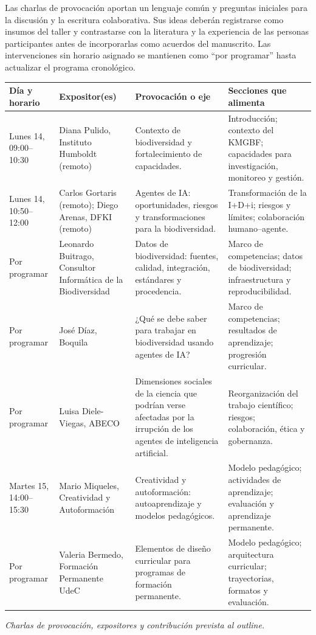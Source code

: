 \documentclass[11pt,a4paper]{article}
\begin{document}
Las charlas de provocación aportan un lenguaje común y preguntas iniciales para
la discusión y la escritura colaborativa. Sus ideas deberán registrarse como
insumos del taller y contrastarse con la literatura y la experiencia de las
personas participantes antes de incorporarlas como acuerdos del manuscrito. Las
intervenciones sin horario asignado se mantienen como ``por programar'' hasta
actualizar el programa cronológico.

\begin{center}
\footnotesize
\begin{tabularx}{\textwidth}{@{}
  >{\raggedright\arraybackslash}p{2.2cm}
  >{\raggedright\arraybackslash}p{3.4cm}
  >{\raggedright\arraybackslash}X
  >{\raggedright\arraybackslash}p{3.5cm}@{}}
\toprule
\textbf{Día y horario} & \textbf{Expositor(es)} &
\textbf{Provocación o eje} & \textbf{Secciones que alimenta}\\
\midrule
Lunes 14, 09:00--10:30 &
Diana Pulido, Instituto Humboldt (remoto) &
Contexto de biodiversidad y fortalecimiento de capacidades. &
Introducción; contexto del KMGBF; capacidades para investigación, monitoreo y
gestión.\\
Lunes 14, 10:50--12:00 &
Carlos Gortaris (remoto); Diego Arenas, DFKI (remoto) &
Agentes de IA: oportunidades, riesgos y transformaciones para la biodiversidad. &
Transformación de la I+D+i; riesgos y límites; colaboración humano--agente.\\
Por programar &
Leonardo Buitrago, Consultor Informática de la Biodiversidad &
Datos de biodiversidad: fuentes, calidad, integración, estándares y
procedencia. &
Marco de competencias; datos de biodiversidad; infraestructura y
reproducibilidad.\\
Por programar &
José Díaz, Boquila &
¿Qué se debe saber para trabajar en biodiversidad usando agentes de IA? &
Marco de competencias; resultados de aprendizaje; progresión curricular.\\
Por programar &
Luisa Diele-Viegas, ABECO &
Dimensiones sociales de la ciencia que podrían verse afectadas por la irrupción
de los agentes de inteligencia artificial. &
Reorganización del trabajo científico; riesgos; colaboración, ética y
gobernanza.\\
Martes 15, 14:00--15:30 &
Mario Miqueles, Creatividad y Autoformación &
Creatividad y autoformación: autoaprendizaje y modelos pedagógicos. &
Modelo pedagógico; actividades de aprendizaje; evaluación y aprendizaje
permanente.\\
Por programar &
Valeria Bermedo, Formación Permanente UdeC &
Elementos de diseño curricular para programas de formación permanente. &
Modelo pedagógico; arquitectura curricular; trayectorias, formatos y
evaluación.\\
\bottomrule
\end{tabularx}
\par\medskip
\textit{Charlas de provocación, expositores y contribución prevista al outline.}
\end{center}
\end{document}

